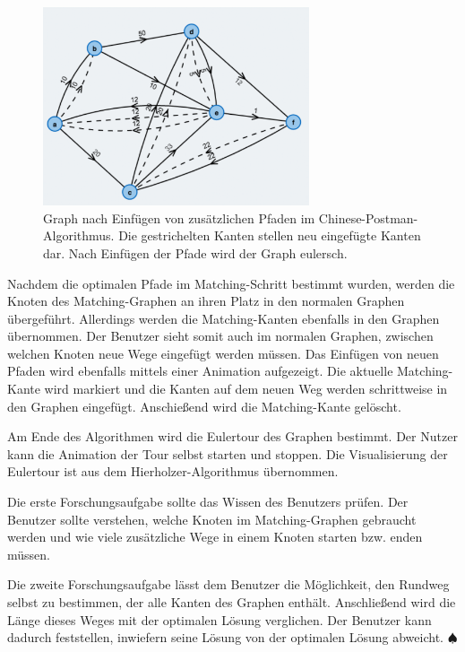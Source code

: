 \begin{figure}[h!]
	\centering
	\includegraphics[width=0.70\textwidth]{figures/postman_eulerian}
	\caption[Chinese-Postman: Eulerscher Graph]{Graph nach Einfügen von zusätzlichen Pfaden im Chinese-Postman-Algorithmus. Die gestrichelten Kanten stellen neu eingefügte Kanten dar. Nach Einfügen der Pfade wird der Graph eulersch.}\label{fig:postman_eulerian}
\end{figure}

Nachdem die optimalen Pfade im Matching-Schritt bestimmt wurden, werden die Knoten des Matching-Graphen an ihren Platz in den normalen Graphen übergeführt. Allerdings werden die Matching-Kanten ebenfalls in den Graphen übernommen. Der Benutzer sieht somit auch im normalen Graphen, zwischen welchen Knoten neue Wege eingefügt werden müssen.
Das Einfügen von neuen Pfaden wird ebenfalls mittels einer Animation aufgezeigt. Die aktuelle Matching-Kante wird markiert und die Kanten auf dem neuen Weg werden schrittweise in den Graphen eingefügt. Anschießend wird die Matching-Kante gelöscht.

Am Ende des Algorithmen wird die Eulertour des Graphen bestimmt. Der Nutzer kann die Animation der Tour selbst starten und stoppen. Die Visualisierung der Eulertour ist aus dem Hierholzer-Algorithmus übernommen.

Die erste Forschungsaufgabe sollte das Wissen des Benutzers prüfen. Der Benutzer sollte verstehen, welche Knoten im Matching-Graphen gebraucht werden und wie viele zusätzliche Wege in einem Knoten starten bzw. enden müssen.

Die zweite Forschungsaufgabe lässt dem Benutzer die Möglichkeit, den Rundweg selbst zu bestimmen, der alle Kanten des Graphen enthält. Anschließend wird die Länge dieses Weges mit der optimalen Lösung verglichen. Der Benutzer kann dadurch feststellen, inwiefern seine Lösung von der optimalen Lösung abweicht. \hfill$\spadesuit$

